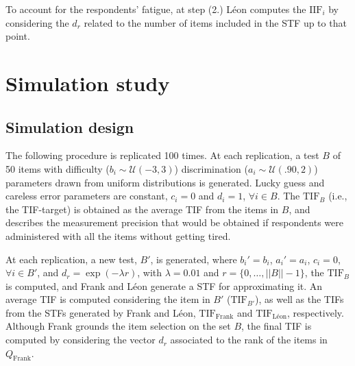 \documentclass{svproc}
\begin{document}
To account for the respondents' fatigue, at step (2.) Léon computes the $\text{IIF}_i$ by considering the $d_r$ related to the number of items included in the STF up to that point.  
\normalcolor


\section{Simulation study}

\subsection{Simulation design}



The following procedure is replicated 100 times. At each replication, a test $B$ of 50 items with difficulty ($b_i \sim \mathcal{U}(-3, 3)$) discrimination ($a_i \sim \mathcal{U}(.90, 2)$) parameters drawn from uniform distributions is generated. Lucky 
guess and careless error parameters are constant, $c_i = 0$ and $d_i = 1$, $\forall i \in B$.
The $\text{TIF}_B$ (i.e., the TIF-target) is obtained as the average TIF  from the items in $B$, and describes the measurement precision that would be obtained if respondents were administered with all the items without getting tired. 

At each replication, a new test, $B'$, is generated, where $b_i' = b_i$, $a_i' = a_i$, $c_i = 0$, $\forall i \in B'$, and $d_r = \exp(-\lambda r)$, with $\lambda = 0.01$ and $r = \{0, \ldots, ||B|| -1\}$, the $\text{TIF}_B$ is computed, and Frank and Léon generate a STF for approximating it. 
An average TIF is computed considering the item in $B'$ ($\text{TIF}_{B'}$), as well as the TIFs from the STFs generated by Frank and Léon, $\text{TIF}_{\text{Frank}}$ and $\text{TIF}_{\text{Léon}}$, respectively.
Although Frank grounds the item selection on the set $B$, the final TIF is computed by considering the vector $d_r$ associated to the rank of the items in $Q_{\text{Frank}}$.
\normalcolor
\end{document}
